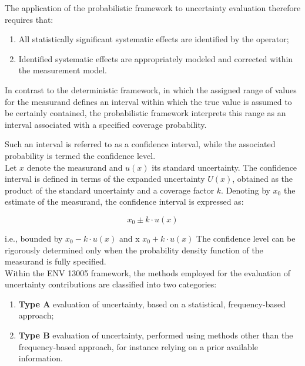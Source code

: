 \documentclass[../main.tex]{subfiles}
\begin{document}
The application of the probabilistic framework to uncertainty evaluation therefore requires that:

\begin{enumerate}[label = \textbf{-}]
	\item All statistically significant systematic effects are identified by the operator;
	\item Identified systematic effects are appropriately modeled and corrected within the measurement model.
\end{enumerate}

In contrast to the deterministic framework, in which the assigned range of values for the measurand defines an interval within which the true value is assumed to be certainly contained, the probabilistic framework interprets this range as an interval associated with a specified coverage probability. 

Such an interval is referred to as a confidence interval, while the associated probability is termed the confidence level.\\

Let $x$ denote the measurand and $u(x)$ its standard uncertainty. 
The confidence interval is defined in terms of the expanded uncertainty $U(x)$, obtained as the product of the standard uncertainty and a coverage factor $k$. Denoting by $x_0$ the estimate of the measurand, the confidence interval is expressed as:

\begin{equation}
	x_0 \pm k \cdot u(x)
\end{equation}

i.e., bounded by $x_0 - k \cdot u(x)$ and x $x_0 + k \cdot u(x)$ The confidence level can be rigorously determined only when the probability density function of the measurand is fully specified.\\

Within the ENV 13005 framework, the methods employed for the evaluation of uncertainty contributions are classified into two categories:

\begin{enumerate}[label=\textbf{-}]
	\item \textbf{Type A} evaluation of uncertainty, based on a statistical, frequency-based approach;
	\item \textbf{Type B} evaluation of uncertainty, performed using methods other than the frequency-based approach, for instance relying on a prior available information.
\end{enumerate}
\end{document}
